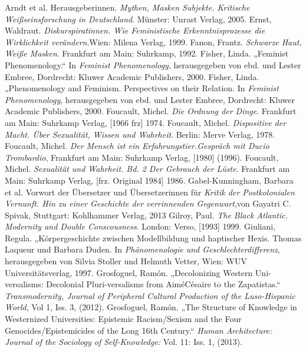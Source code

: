 \begin{thebibliography}{100}
Arndt  et al. Herausgeberinnen. \emph{Mythen, Masken Subjekte. Kritische
Weißseinsforschung in Deutschland}. Münster: Unrast Verlag, 2005.
 Ernst, Waldraut. \emph{Diskurspiratinnen. Wie Feministische
  Erkenntnisprozesse die Wirklichkeit verändern}.Wien: Milena Verlag, 1999.
   Fanon, Frantz. \emph{Schwarze Haut, Weiße Masken}. Frankfurt am Main: Suhrkamp, 1992. 
   Fisher, Linda. „Feminist Phenomenology.“ In \emph{Feminist   Phenomenology}, herausgegeben von ebd. und Lester Embree, Dordrecht: Kluwer Academic Publishers, 2000.
   Fisher, Linda. „Phenomenology and Feminism. Perspectives
  on their Relation. In \emph{Feminist Phenomenology}, herausgegeben von ebd. und Lester Embree,  Dordrecht: Kluwer Academic Publishers, 2000. 
   Foucault, Michel. \emph{Die Ordnung der Dinge}. Frankfurt am Main: Suhrkamp Verlag, [1966 frz] 1974.
   Foucault, Michel. \emph{Dispositive der Macht. Über
  Sexualität, Wissen und Wahrheit}. Berlin: Merve Verlag, 1978.
   Foucault, Michel. \emph{Der Mensch ist ein
  Erfahrungstier.Gespräch mit Ducio Trombardio}, Frankfurt am Main: Suhrkamp Verlag, [1980] (1996).
   Foucault, Michel. \emph{Sexualität und Wahrheit. Bd. 2
  Der Gebrauch der Lüste}.  Frankfurt am Main: Suhrkamp Verlag, [frz. Original 1984] 1986.
   Gabel-Kunningham, Barbara et al. Vorwort der Übersetzer
  und Übersetzerinnen für \emph{Kritik der Postkolonialen Vernunft. Hin zu
  einer Geschichte der verrinnenden Gegenwart},von Gayatri C. Spivak, Stuttgart: Kohlhammer Verlag, 2013
   Gilroy, Paul. \emph{The Black Atlantic. Modernity and Double Conscousness}. London: Verso, [1993] 1999.
   Giuliani, Regula. „Körpergeschichte zwischen Modellbildung und haptischer Hexis. Thomas
  Laqueur und Barbara Duden. In \emph{Phänomenologie und Geschlechterdifferenz}, herausgegeben von Silvia Stoller und Helmuth Vetter, Wien: WUV Universitätsverlag, 1997.
   Grosfoguel, Ramón. „Decolonizing Western Uni-versalisms:
  Decolonial Pluri-versalisms from AiméCésaire to the Zapatistas.“ \emph{Transmodernity, Journal of Peripheral Cultural Production of the Luso-Hispanic World}, Vol 1, Iss. 3, (2012). 
   Grosfoguel, Ramón. „The Structure of Knowledge in Westernized Universities: Epistemic
Racism/Sexism and the Four Genocides/Epistemicides of the Long 16th Century.“
\emph{Human Architecture: Journal of the Sociology of Self-Knowledge:} Vol. 11: Iss. 1, (2013). 

\end{thebibliography}
